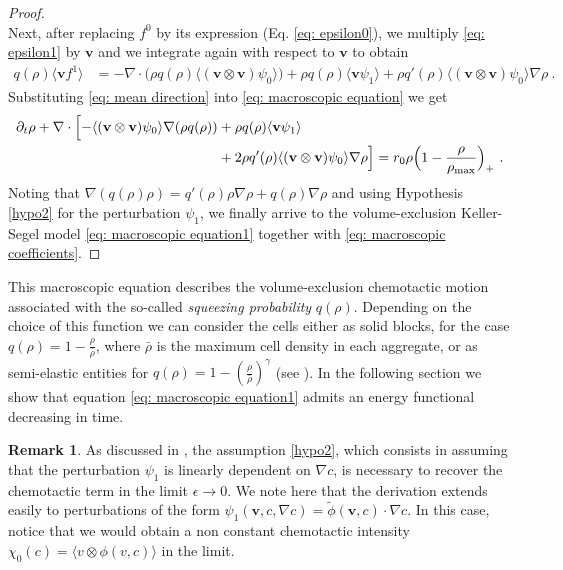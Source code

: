 \documentclass{aims} %
\theoremstyle{definition}
\newtheorem{remark}[theorem]{Remark}
\begin{document}
\begin{proof}
\begin{equation}
\end{equation}
Next, after replacing $f^0$ by its expression (Eq. \ref{eq: epsilon0}), we multiply \eqref{eq: epsilon1} by $\mathbf{v}$ and we integrate again with respect to $\mathbf{v}$ to obtain
\begin{align}
    q(\rho)\langle\mathbf{v}f^1\rangle&=- \nabla \cdot \big(\rho q(\rho) \langle(\mathbf{v}\otimes \mathbf{v})\psi_0\rangle \big)+\rho q(\rho)\langle \mathbf{v}\psi_1\rangle  +\rho q'(\rho) \langle(\mathbf{v}\otimes \mathbf{v})\psi_0\rangle  \nabla\rho\ .\label{eq: mean direction}
\end{align}
Substituting \eqref{eq: mean direction} into \eqref{eq: macroscopic equation} we get
\begin{align*}
    \partial_t\rho+\nabla\cdot\Bigl[-\langle(\mathbf{v}\otimes \mathbf{v}) \psi_0\rangle \nabla(\rho q(\rho))&+\rho q(\rho)\langle\mathbf{v} \psi_1\rangle \nonumber\\
    &+2 \rho q'(\rho)\langle(\mathbf{v}\otimes \mathbf{v})\psi_0\rangle\nabla\rho  \Bigr]={ r_0\rho\Bigl(1-\frac{\rho}{\rho_{\textnormal{max}}} \Bigr)_+}\ . 
\end{align*}
Noting that $\nabla(q(\rho)\rho)=q'(\rho)\rho\nabla\rho+q(\rho)\nabla\rho$ and using Hypothesis \ref{hypo2} for the perturbation $\psi_1$, we finally arrive to the volume-exclusion Keller-Segel model \eqref{eq: macroscopic equation1} together with \eqref{eq: macroscopic coefficients}.
\end{proof}


This macroscopic equation describes the
volume-exclusion chemotactic motion associated with the so-called \textit{squeezing probability} $q(\rho)$. Depending on the choice of this function we can consider the cells either as solid blocks, for the case $q(\rho)=1-\frac{\rho}{\bar{\rho}}$, where $\bar{\rho}$ is the maximum cell density in each aggregate, or as semi-elastic entities for $q(\rho)=1-\left(\frac{\rho}{\bar{\rho}} \right)^\gamma$ (see \cite{wang2007classical}). {In the following section we show that equation \eqref{eq: macroscopic equation1} admits an energy functional decreasing in time}. 

\begin{remark}\label{remark}
As discussed in \cite{othmer2002diffusion}, the assumption \eqref{hypo2}, which consists in assuming that the perturbation $\psi_1$ is linearly dependent on $\nabla c$, is necessary to recover the chemotactic term in the limit $\epsilon \rightarrow 0$. We note here that the derivation extends easily to perturbations of the form $\psi_1(\mathbf{v},c,\nabla c) = \tilde{\phi}(\mathbf{v},c) \cdot \nabla c$. In this case, notice that we would obtain a non constant chemotactic intensity $\chi_0(c) = \langle v \otimes \phi(v,c) \rangle$ in the limit. 
\end{remark}
\end{document}
